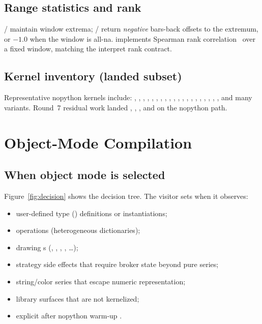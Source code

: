 \documentclass[11pt,a4paper]{article}
\renewcommand{\na}{\textsf{na}}
\begin{document}
\subsection{Range statistics and rank}

/ maintain window extrema; /
 return \emph{negative} bars-back offsets to the extremum,
or $-1.0$ when the window is all-\na{}.  implements Spearman
rank correlation~\citep{spearman1904} over a fixed window, matching the
interpret rank contract.

\subsection{Kernel inventory (landed subset)}

Representative nopython kernels include:
, , , , , ,
, , , , , ,
, , , , ,
, , , and many  variants.
Round~7 residual work landed , , , and
 on the nopython path.

\section{Object-Mode Compilation}
\label{sec:object}

\subsection{When object mode is selected}

Figure~\ref{fig:decision} shows the decision tree. The visitor sets
 when it observes:
\begin{itemize}[leftmargin=*]
  \item user-defined type (\udt{}) definitions or instantiations;
  \item {} operations (heterogeneous dictionaries);
  \item drawing \api{}s (, , , ,
        \ldots);
  \item strategy side effects that require broker state beyond pure series;
  \item string/color series that escape numeric representation;
  \item library  surfaces that are not kernelized;
  \item explicit  after nopython warm-up
        .
\end{itemize}
\end{document}
